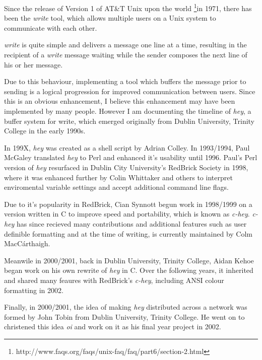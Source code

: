 Since the release of Version 1 of AT\&T Unix upon the world 
\footnote{http://www.faqs.org/faqs/unix-faq/faq/part6/section-2.html}{in 1971}, 
there has been the \emph{write} tool, which allows multiple users on a Unix 
system to communicate with each other.


\emph{write} is quite simple and delivers a message one line at a time,
resulting in the recipient of a \emph{write} message waiting while the
sender composes the next line of his or her message.


Due to this behaviour, implementing a tool which buffers the message
prior to sending is a logical progression for improved communication
between users. Since this is an obvious enhancement, I believe this
enhancement may have been implemented by many people. However I am 
documenting the timeline of \emph{hey}, a buffer system for write,
which emerged originally from Dublin University, Trinity College in the 
early 1990s.


In 199X, \emph{hey} was created as a shell script by Adrian Colley. In 
1993/1994, Paul McGaley translated \emph{hey} to Perl and enhanced it's 
usability until 1996. Paul's Perl version of \emph{hey} resurfaced in 
Dublin City University's RedBrick Society in 1998, where it was enhanced
further by Colin Whittaker and others to interpret enviromental variable 
settings and accept additional command line flags.


Due to it's popularity in RedBrick, Cian Synnott begun work in 1998/1999
on a version written in C to improve speed and portability, which is 
known as \emph{c-hey}. \emph{c-hey} has since recieved many 
contributions and additional features such as user definible formatting 
and at the time of writing, is currently maintained by Colm 
MacC\'{a}rthaigh.


Meanwile in 2000/2001, back in Dublin University, Trinity College, Aidan 
Kehoe began work on his own rewrite of \emph{hey} in C. Over the 
following years, it inherited and shared many feaures with RedBrick's 
\emph{c-hey}, including ANSI colour formatting in 2002.


Finally, in 2000/2001, the idea of making \emph{hey} distributed across 
a network was formed by John Tobin from Dublin University, Trinity 
College.  He went on to christened this idea \emph{oi} and work on it 
as his final year project in 2002. 
